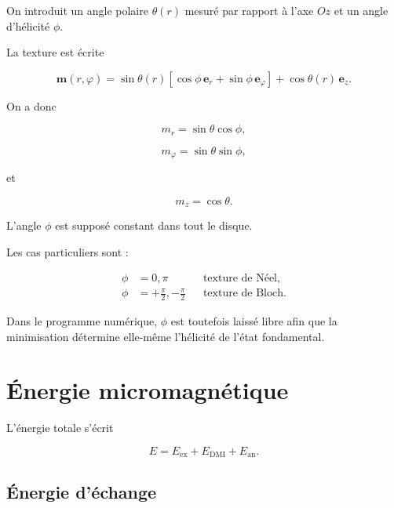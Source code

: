 \documentclass[a4paper,11pt]{article}
\newcommand{\m}{\bm{m}}
\newcommand{\er}{\bm{e}_r}
\newcommand{\ephi}{\bm{e}_\varphi}
\newcommand{\ez}{\bm{e}_z}
\begin{document}
On introduit un angle polaire $\theta(r)$ mesuré par rapport à l'axe $Oz$
et un angle d'hélicité $\phi$.

La texture est écrite

\begin{equation}
\boxed{
\m(r,\varphi)
=
\sin\theta(r)
\left[
\cos\phi\,\er
+
\sin\phi\,\ephi
\right]
+
\cos\theta(r)\,\ez.
}
\end{equation}

On a donc

\begin{equation}
m_r = \sin\theta\cos\phi,
\end{equation}

\begin{equation}
m_\varphi = \sin\theta\sin\phi,
\end{equation}

et

\begin{equation}
m_z = \cos\theta.
\end{equation}

L'angle $\phi$ est supposé constant dans tout le disque.

Les cas particuliers sont :

\begin{align}
\phi &= 0,\pi
&&\text{texture de Néel},\\
\phi &= +\frac{\pi}{2},-\frac{\pi}{2}
&&\text{texture de Bloch}.
\end{align}

Dans le programme numérique, $\phi$ est toutefois laissé libre afin que la
minimisation détermine elle-même l'hélicité de l'état fondamental.

\section{Énergie micromagnétique}

L'énergie totale s'écrit

\begin{equation}
E =
E_{\mathrm{ex}}
+
E_{\mathrm{DMI}}
+
E_{\mathrm{an}}.
\end{equation}

\subsection{Énergie d'échange}
\end{document}
